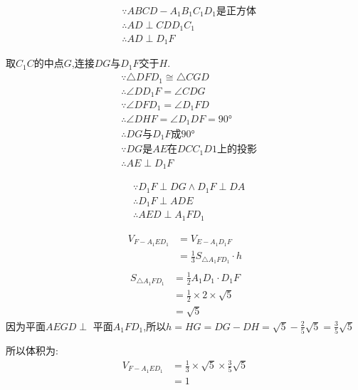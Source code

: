 \documentclass[answers]{exam}
\begin{document}
\begin{questions}
	\begin{solution}
		\begin{penum}
			\item
			\begin{align*}
				 & \because ABCD-A_1B_1C_1D_1\text{是正方体} \\
				 & \therefore AD \perp CDD_1C_1          \\
				 & \therefore AD \perp D_1F
			\end{align*}
			\item
			取$C_1C$的中点$G$,连接$DG$与$D_1F$交于$H$.
			\begin{align*}
				 & \because \triangle{DFD_1} \cong \triangle{CGD}  \\
				 & \therefore \angle{DD_1F} = \angle{CDG}          \\
				 & \because \angle{DFD_1} = \angle{D_1FD}          \\
				 & \therefore \angle{DHF}=\angle{D_1DF} = \ang{90} \\
				 & \therefore DG \text{与} D_1F \text{成}\ang{90}    \\
				 & \because DG \text{是}AE\text{在}DCC_1D1上的投影       \\
				 & \therefore AE \perp D_1F
			\end{align*}
			\item
			\begin{align*}
				 & \because D_1F \perp DG \land D_1F \perp DA \\
				 & \therefore D_1F \perp ADE                  \\
				 & \therefore AED \perp A_1FD_1
			\end{align*}
			\item
			\begin{align*}
				V_{F-A_1ED_1} & = V_{E-A_1D_1F}                        \\
				              & = \frac13S_{\triangle{A_1FD_1}}\cdot h \\
			\end{align*}
			\begin{align*}
				S_{\triangle{A_1FD_1}} & = \frac12A_1D_1\cdot D_1F          \\
				                       & = \frac12 \times 2 \times \sqrt{5} \\
				                       & = \sqrt{5}
			\end{align*}
			因为平面$AEGD \perp$ 平面$A_1FD_1$,所以$h=HG=DG - DH = \sqrt{5} - \frac25{\sqrt{5}} = \frac35\sqrt{5}$

			所以体积为:
			\begin{align*}
				V_{F-A_1ED_1} & = \frac13 \times \sqrt{5} \times \frac35\sqrt{5} \\
				              & = 1
			\end{align*}
		\end{penum}
	\end{solution}


\end{questions}
\end{document}
